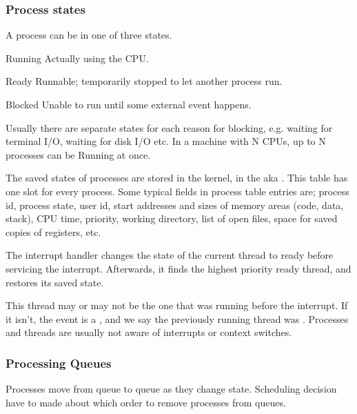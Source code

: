 \subsubsection{Process states}
A process can be in one of three states.
\begin{compactitem}
\item Running Actually using the CPU.
\item Ready Runnable; temporarily stopped to let another process run.
\item Blocked Unable to run until some external event happens.
\begin{compactitem}
Usually there are separate states for each reason for blocking, e.g. waiting
for terminal I/O, waiting for disk I/O etc.
In a machine with N CPUs, up to N processes can be Running at once.

The saved states of processes are stored in the kernel, in the  aka .
This table has one slot for every process. Some typical fields in process
table entries are; process id, process state, user id, start addresses and sizes of memory areas (code, data, stack), CPU time, priority, working directory, list of open files, space for saved copies of registers, etc.

The interrupt handler changes the state of the current thread to ready
before servicing the interrupt. Afterwards, it finds the highest priority
ready thread, and restores its saved state.

This thread may or may not be the one that was running before the
interrupt. If it isn’t, the event is a , and we say the
previously running thread was .
Processes and threads are usually not aware of interrupts or context
switches.

\subsubsection{Processing Queues}
Processes move from queue to queue as they change state. Scheduling
decision have to made about which order to remove processes from queues.


\end{compactitem}
\end{compactitem}
